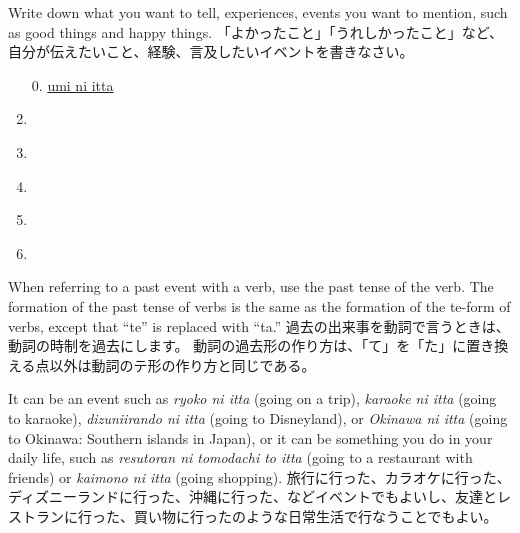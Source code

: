 \documentclass[uplatex,dvipdfmx,b5paper,english,10pt]{jsbook}
\begin{document}

\begin{toiquestion}
\ifEnglish
Write down what you want to tell, experiences, events you want to mention, such as good things and happy things.
\else
「よかったこと」「うれしかったこと」など、自分が伝えたいこと、経験、言及したいイベントを書きなさい。
\fi
\end{toiquestion}

\begin{enumerate}
  \item[0.] \underline{\hspace{1em}umi ni itta\hspace{18.2em}}
  \item \underline{\hspace{24em}}
  \item \underline{\hspace{24em}}
  \item \underline{\hspace{24em}}
  \item \underline{\hspace{24em}}
  \item \underline{\hspace{24em}}
\end{enumerate}

\begin{note}
\ifEnglish
When referring to a past event with a verb, use the past tense of the verb.
The formation of the past tense of verbs is the same as the formation of the te-form of verbs, except that ``te'' is replaced with ``ta.''
\else
過去の出来事を動詞で言うときは、動詞の時制を過去にします。
動詞の過去形の作り方は、「て」を「た」に置き換える点以外は動詞のテ形の作り方と同じである。
\fi
\end{note}

\begin{toianswer}
\ifEnglish
It can be an event such as {\it ryoko ni itta\/} (going on a trip), {\it karaoke ni itta\/} (going to karaoke), {\it dizuniirando ni itta\/} (going to Disneyland), or {\it Okinawa ni itta\/} (going to Okinawa: Southern islands in Japan), or it can be something you do in your daily life, such as {\it resutoran ni tomodachi to itta\/} (going to a restaurant with friends) or {\it kaimono ni itta\/} (going shopping).
\else
旅行に行った、カラオケに行った、ディズニーランドに行った、沖縄に行った、などイベントでもよいし、友達とレストランに行った、買い物に行ったのような日常生活で行なうことでもよい。
\fi
\end{toianswer}
\end{document}
